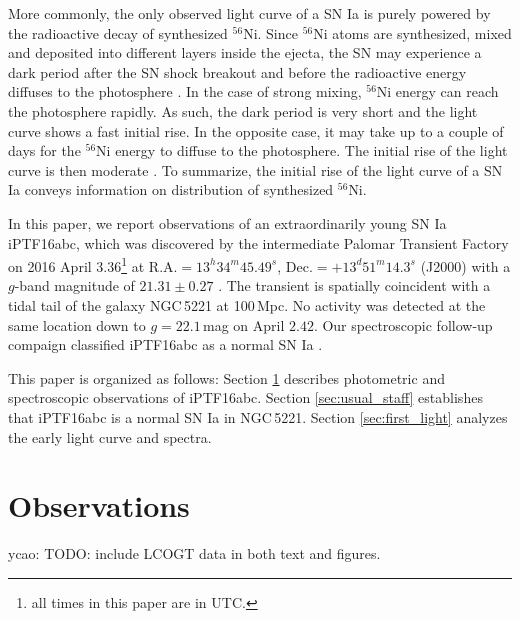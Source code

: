 \documentclass[twocolumn]{aastex61}
\newcommand{\ycao}[1]{{\color{red} ycao: {#1}}}
\begin{document}
More commonly, the only observed light curve of a SN Ia is purely
powered by the radioactive decay of synthesized $^{56}$Ni. Since
$^{56}$Ni atoms are synthesized, mixed and deposited into different
layers inside the ejecta, the SN may experience a dark period after
the SN shock breakout and before the radioactive energy diffuses to
the photosphere \citep{2014ApJ...784...85P}. In the case of strong
mixing, $^{56}$Ni energy can reach the photosphere rapidly. As such,
the dark period is very short and the light curve shows a fast initial
rise. In the opposite case, it may take up to a couple of days for
the $^{56}$Ni energy to diffuse to the photosphere. The initial rise
of the light curve is then moderate \citep{2016ApJ...826...96P}. To
summarize, the initial rise of the light curve of a SN Ia conveys
information on distribution of synthesized $^{56}$Ni. 

In this paper, we report observations of an extraordinarily young SN
Ia iPTF16abc, which was discovered by the intermediate Palomar
Transient Factory on 2016 April $3.36$\footnote{all times in this
  paper are in UTC.} at $\textrm{R.A.}=13^h34^m45.49^s$,
$\textrm{Dec.}=+13^d51^m14.3^s$ (J2000) with a $g$-band magnitude of
$21.31\pm0.27$ \citep{2016PASP..128k4502C,2016ATel.8907....1M}. The
transient is spatially coincident with a tidal tail of the galaxy
NGC\,5221 at 100\,Mpc. No activity was detected at the same location
down to $g=22.1$\,mag on April $2.42$. Our spectroscopic follow-up
compaign classified iPTF16abc as a normal SN Ia
\citep{2016ATel.8909....1C}.

This paper is organized as follows: Section \ref{sec:obs} describes
photometric and spectroscopic observations of iPTF16abc. Section
\ref{sec:usual_staff} establishes that iPTF16abc is a normal SN Ia
in NGC\,5221. Section \ref{sec:first_light} analyzes the early
light curve and spectra.

\section{Observations}
\label{sec:obs}

\ycao{TODO: include LCOGT data in both text and figures.}
\end{document}
